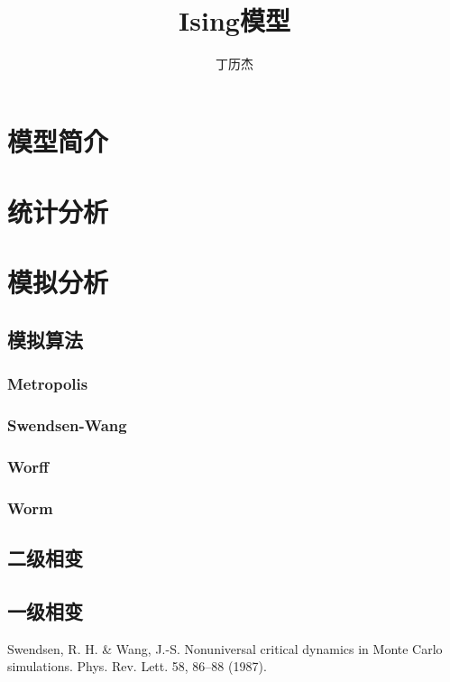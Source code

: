 \documentclass[12pt]{article} %
\title{Ising模型}
\author{丁历杰}
\date{}
\begin{document}
\maketitle
\section{模型简介}

\section{统计分析}

\section{模拟分析}

\subsection{模拟算法}
\subsubsection{Metropolis}
\subsubsection{Swendsen-Wang}
\cite{Swendsen:1987eq}
\subsubsection{Worff}
\subsubsection{Worm}


\subsection{二级相变}

\subsection{一级相变}


\renewcommand\refname{参考文献}
\begin{thebibliography}{99}
        Swendsen, R. H. \& Wang, J.-S. Nonuniversal critical dynamics in Monte Carlo simulations. Phys. Rev. Lett. 58, 86–88 (1987).

\end{thebibliography}
\end{document}
